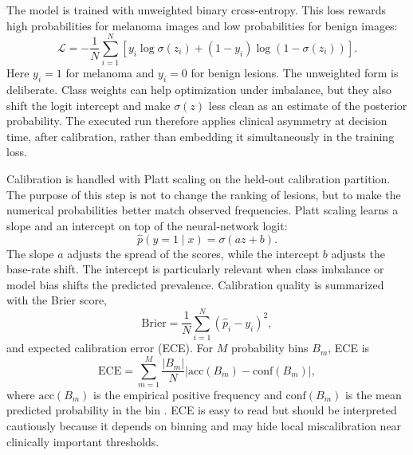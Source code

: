 \documentclass[11pt,a4paper]{article}
\begin{document}
The model is trained with unweighted binary cross-entropy. This loss rewards high probabilities for melanoma images and low probabilities for benign images:
\begin{equation}
    \mathcal{L} = -\frac{1}{N}\sum_{i=1}^{N}
    \left[y_i\log\sigma(z_i)+(1-y_i)\log(1-\sigma(z_i))\right].
\end{equation}
Here $y_i=1$ for melanoma and $y_i=0$ for benign lesions. The unweighted form is deliberate. Class weights can help optimization under imbalance, but they also shift the logit intercept and make $\sigma(z)$ less clean as an estimate of the posterior probability. The executed run therefore applies clinical asymmetry at decision time, after calibration, rather than embedding it simultaneously in the training loss.

Calibration is handled with Platt scaling on the held-out calibration partition. The purpose of this step is not to change the ranking of lesions, but to make the numerical probabilities better match observed frequencies. Platt scaling learns a slope and an intercept on top of the neural-network logit:
\begin{equation}
    \hat{p}(y=1\mid x) = \sigma(az+b).
\end{equation}
\noindent The slope $a$ adjusts the spread of the scores, while the intercept $b$ adjusts the base-rate shift. The intercept is particularly relevant when class imbalance or model bias shifts the predicted prevalence. Calibration quality is summarized with the Brier score,
\begin{equation}
    \mathrm{Brier} = \frac{1}{N}\sum_{i=1}^{N}\left(\hat{p}_i-y_i\right)^2,
\end{equation}
and expected calibration error (ECE). For $M$ probability bins $B_m$, ECE is
\begin{equation}
    \mathrm{ECE} = \sum_{m=1}^{M}\frac{|B_m|}{N}
    \left|\mathrm{acc}(B_m)-\mathrm{conf}(B_m)\right|,
\end{equation}
where $\mathrm{acc}(B_m)$ is the empirical positive frequency and $\mathrm{conf}(B_m)$ is the mean predicted probability in the bin \citep{guo2017calibration}. ECE is easy to read but should be interpreted cautiously because it depends on binning and may hide local miscalibration near clinically important thresholds.
\end{document}
